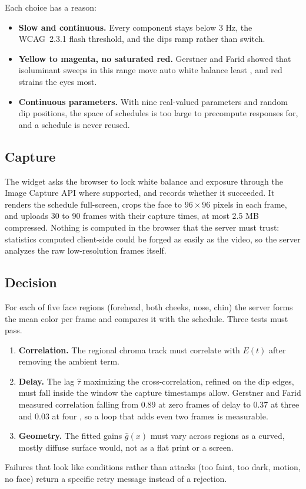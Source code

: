 \documentclass[11pt]{article}
\begin{document}
Each choice has a reason:
\begin{itemize}
  \item \textbf{Slow and continuous.} Every component stays below 3 Hz, the WCAG~2.3.1 flash
        threshold, and the dips ramp rather than switch.
  \item \textbf{Yellow to magenta, no saturated red.} Gerstner and Farid showed that isoluminant
        sweeps in this range move auto white balance least \cite{gerstner-farid}, and red strains
        the eyes most.
  \item \textbf{Continuous parameters.} With nine real-valued parameters and random dip positions,
        the space of schedules is too large to precompute responses for, and a schedule is never
        reused.
\end{itemize}

\subsection{Capture}

The widget asks the browser to lock white balance and exposure through the Image Capture API
where supported, and records whether it succeeded. It renders the schedule full-screen, crops the
face to $96 \times 96$ pixels in each frame, and uploads 30 to 90 frames with their capture
times, at most 2.5 MB compressed. Nothing is computed in the browser that the server must trust:
statistics computed client-side could be forged as easily as the video, so the server analyzes
the raw low-resolution frames itself.

\subsection{Decision}

For each of five face regions (forehead, both cheeks, nose, chin) the server forms the mean color
per frame and compares it with the schedule. Three tests must pass.
\begin{enumerate}
  \item \textbf{Correlation.} The regional chroma track must correlate with $E(t)$ after removing
        the ambient term.
  \item \textbf{Delay.} The lag $\hat\tau$ maximizing the cross-correlation, refined on the dip
        edges, must fall inside the window the capture timestamps allow. Gerstner and Farid
        measured correlation falling from 0.89 at zero frames of delay to 0.37 at three and 0.03
        at four \cite{gerstner-farid}, so a loop that adds even two frames is measurable.
  \item \textbf{Geometry.} The fitted gains $\hat g(x)$ must vary across regions as a curved,
        mostly diffuse surface would, not as a flat print or a screen.
\end{enumerate}
Failures that look like conditions rather than attacks (too faint, too dark, motion, no face)
return a specific retry message instead of a rejection.
\end{document}
